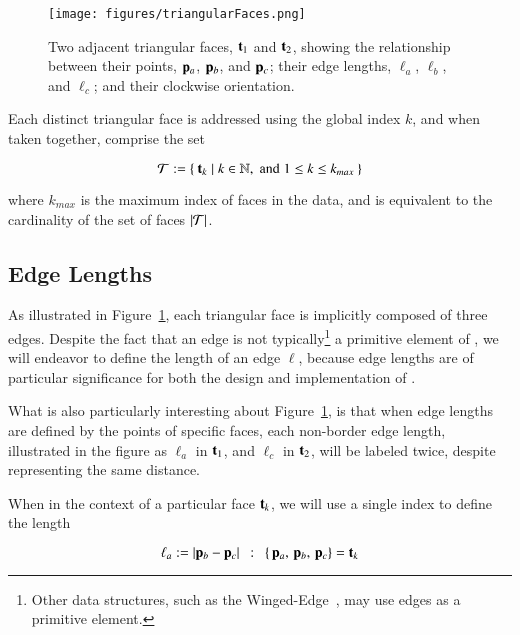 \begin{figure}[ht]
\ffigbox
	{\texttt{[image: figures/triangularFaces.png]}}
	{\caption[Two Adjacent Triangular Faces]{Two adjacent triangular faces, $\mathbf{t}_1$ and $\mathbf{t}_2$, showing the relationship between their points, $\mathbf{p}_a$, $\mathbf{p}_b$, and $\mathbf{p}_c$; their edge lengths, $\ell_a$, $\ell_b$, and $\ell_c$; and their clockwise orientation.}\label{fig:triangularFaces}}
\end{figure}

Each distinct triangular face is addressed using the global index $k$, and when taken together, comprise the set

\begin{equation}
	\mathcal{T} := \left \{\:\mathbf{t}_k \mid k \in \mathbb{N}, \;\text{and}\; 1\leq k \leq k_{max}\:\right \}
	\label{eq:defineSetOfFaces}
\end{equation}

where $k_{max}$ is the maximum index of faces in the data, and is equivalent to the cardinality of the set of faces $|\mathcal{T}|$.%
%
%

%
%
%
%
\subsection{Edge Lengths}
\label{ch2sTDDssEL}
As illustrated in Figure~\ref{fig:triangularFaces}, each triangular face is implicitly composed of three edges. Despite the fact that an edge is not typically\footnote{Other data structures, such as the Winged-Edge~\cite[p.~1]{Baumgart75}, may use edges as a primitive element.} a primitive element of \tdd{}, we will endeavor to define the length of an edge $\ell$, because edge lengths are of particular significance for both the design and implementation of .

What is also particularly interesting about Figure~\ref{fig:triangularFaces}, is that when edge lengths are defined by the points of specific faces, each non-border edge length, illustrated in the figure as $\ell_a$ in $\mathbf{t}_1$, and $\ell_c$ in $\mathbf{t}_2$, will be labeled twice, despite representing the same distance.

When in the context of a particular face $\mathbf{t}_k$, we will use a single index to define the length

\begin{equation}
	\ell_a := |\mathbf{p}_b - \mathbf{p}_c| \enspace:\enspace \left \{\,\mathbf{p}_a,\,\mathbf{p}_b,\,\mathbf{p}_c\right \} = \mathbf{t}_k
	\label{eq:defineEdgeLengthFace}
\end{equation}%
%

